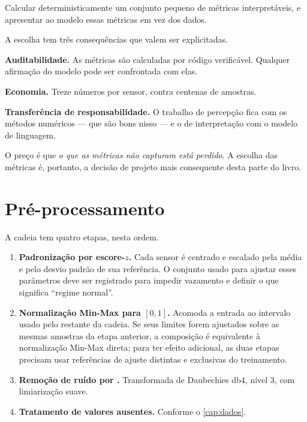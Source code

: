 \begin{destaque}
Calcular deterministicamente um conjunto pequeno de métricas interpretáveis, e apresentar
ao modelo essas métricas em vez dos dados.

A escolha tem três consequências que valem ser explicitadas.

\textbf{Auditabilidade.} As métricas são calculadas por código verificável. Qualquer
afirmação do modelo pode ser confrontada com elas.

\textbf{Economia.} Treze números por sensor, contra centenas de amostras.

\textbf{Transferência de responsabilidade.} O trabalho de percepção fica com os métodos
numéricos --- que são bons nisso --- e o de interpretação com o modelo de linguagem.

O preço é que \emph{o que as métricas não capturam está perdido}. A escolha das métricas
é, portanto, a decisão de projeto mais consequente desta parte do livro.
\end{destaque}

\section{Pré-processamento}

A cadeia tem quatro etapas, nesta ordem.

\begin{enumerate}[leftmargin=*,itemsep=0.4em]

\item \textbf{Padronização por escore-$z$.} Cada sensor é centrado e escalado pela média
e pelo desvio padrão de sua referência. O conjunto usado para ajustar esses parâmetros
deve ser registrado para impedir vazamento e definir o que significa ``regime normal''.

\item \textbf{Normalização Min-Max para $[0,1]$.} Acomoda a entrada ao intervalo usado
pelo restante da cadeia. Se seus limites forem ajustados sobre as mesmas amostras da
etapa anterior, a composição é equivalente à normalização Min-Max direta; para ter
efeito adicional, as duas etapas precisam usar referências de ajuste distintas e
exclusivas do treinamento.

\item \textbf{Remoção de ruído por .} Transformada de Daubechies db4, nível
3, com limiarização suave.

\item \textbf{Tratamento de valores ausentes.} Conforme o \cref{cap:dados}.

\end{enumerate}

